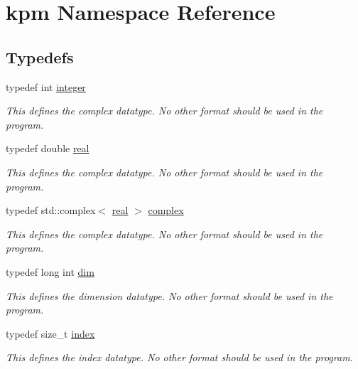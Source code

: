 \hypertarget{namespacekpm}{}\section{kpm Namespace Reference}
\label{namespacekpm}
\subsection*{Typedefs}
\begin{DoxyCompactItemize}
\item 
typedef int \hyperlink{namespacekpm_a7e6b07a9882d7cc03014011f062a8ffd}{integer}\hypertarget{namespacekpm_a7e6b07a9882d7cc03014011f062a8ffd}{}\label{namespacekpm_a7e6b07a9882d7cc03014011f062a8ffd}

\begin{DoxyCompactList}\small\item\em This defines the complex datatype. No other format should be used in the program. \end{DoxyCompactList}\item 
typedef double \hyperlink{namespacekpm_a64d6f7b14a5a68111cb5fd71d4f27454}{real}\hypertarget{namespacekpm_a64d6f7b14a5a68111cb5fd71d4f27454}{}\label{namespacekpm_a64d6f7b14a5a68111cb5fd71d4f27454}

\begin{DoxyCompactList}\small\item\em This defines the complex datatype. No other format should be used in the program. \end{DoxyCompactList}\item 
typedef std\+::complex$<$ \hyperlink{namespacekpm_a64d6f7b14a5a68111cb5fd71d4f27454}{real} $>$ \hyperlink{namespacekpm_a875b8f1ec538e5baeb0d6e8628b6aaac}{complex}\hypertarget{namespacekpm_a875b8f1ec538e5baeb0d6e8628b6aaac}{}\label{namespacekpm_a875b8f1ec538e5baeb0d6e8628b6aaac}

\begin{DoxyCompactList}\small\item\em This defines the complex datatype. No other format should be used in the program. \end{DoxyCompactList}\item 
typedef long int \hyperlink{namespacekpm_aa7eb525e7e126a6c94f0199fa97b2229}{dim}\hypertarget{namespacekpm_aa7eb525e7e126a6c94f0199fa97b2229}{}\label{namespacekpm_aa7eb525e7e126a6c94f0199fa97b2229}

\begin{DoxyCompactList}\small\item\em This defines the dimension datatype. No other format should be used in the program. \end{DoxyCompactList}\item 
typedef size\+\_\+t \hyperlink{namespacekpm_a5bae7402abca1d2e72380bdd9ab9b885}{index}\hypertarget{namespacekpm_a5bae7402abca1d2e72380bdd9ab9b885}{}\label{namespacekpm_a5bae7402abca1d2e72380bdd9ab9b885}

\begin{DoxyCompactList}\small\item\em This defines the index datatype. No other format should be used in the program. \end{DoxyCompactList}\end{DoxyCompactItemize}
